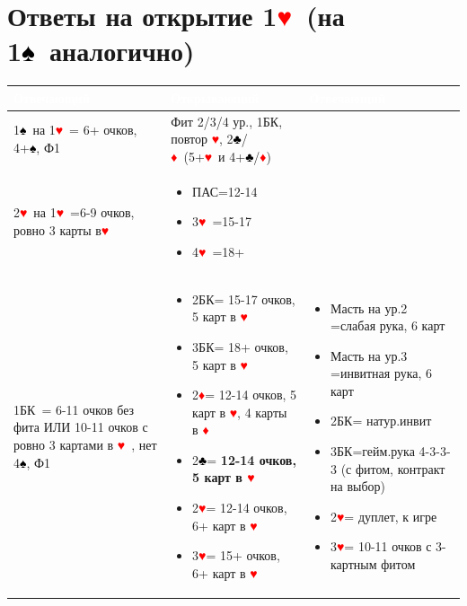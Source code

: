 \documentclass[a4paper,10pt]{article}
\newcommand{\clb}{\textcolor{black}{♣}}
\newcommand{\dia}{\textcolor{red}{♦}}
\newcommand{\hrt}{\textcolor{red}{♥}}
\newcommand{\spd}{\textcolor{black}{♠}}
\newcommand{\NT}{БК}
\begin{document}
\section{Ответы на открытие 1\hrt\ (на 1\spd\ аналогично)}
\noindent
\begin{tabularx}{\textwidth}{|X|X|X|}
\hline
\rowcolor{tableHeader} \textcolor{white}{\textbf{Отвечающий}} & \textcolor{white}{\textbf{Открывающий}} & \textcolor{white}{\textbf{Отвечающий}} \\ \hline
1\spd\ на 1\hrt\ = 6+ очков, 4+\spd, Ф1 & Фит 2/3/4 ур., 1\NT, повтор \hrt, 2\clb/\dia\ (5+\hrt\ и 4+\clb/\dia) & \\ \hline
2\hrt\ на 1\hrt\ =6-9 очков, ровно 3 карты в\hrt & 
\begin{itemize}[label=\textcolor{sputnikRed}{\tiny\(\blacksquare\)}, leftmargin=*, nosep]
    \item ПАС=12-14
    \item 3\hrt\ =15-17
    \item 4\hrt\ =18+
\end{itemize} & \\ \hline
1\NT\ = 6-11 очков без фита ИЛИ 10-11 очков с ровно 3 картами в \hrt\ , нет 4\spd, Ф1 & 
\begin{itemize}[label=\textcolor{sputnikRed}{\tiny\(\blacksquare\)}, leftmargin=*, nosep]
    \item 2\NT = 15-17 очков, 5 карт в \hrt
    \item 3\NT = 18+ очков, 5 карт в \hrt
    \item 2\dia = 12-14 очков, 5 карт в \hrt, 4 карты в \dia
    \item 2\clb = \textbf{12-14 очков, 5 карт в \hrt}
    \item 2\hrt = 12-14 очков, 6+ карт в \hrt
    \item 3\hrt = 15+ очков, 6+ карт в \hrt
\end{itemize} &
\begin{itemize}[label=\textcolor{sputnikRed}{\tiny\(\blacksquare\)}, leftmargin=*, nosep]
    \item Масть на ур.2 =слабая рука, 6 карт
    \item Масть на ур.3 =инвитная рука, 6 карт
    \item 2\NT = натур.инвит
    \item 3\NT =гейм.рука 4-3-3-3 (с фитом, контракт на выбор)
    \item 2\hrt = дуплет, к игре
    \item 3\hrt = 10-11 очков с 3-картным фитом
\end{itemize} \\ \hline 

\end{tabularx}
\end{document}
